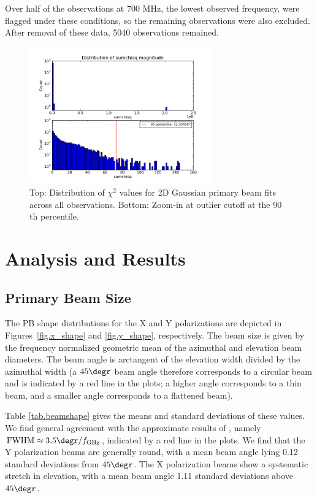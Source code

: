 \documentclass[preprint]{aastex}
\begin{document}
Over half of the observations at 700 MHz, the lowest observed frequency,
were flagged under these conditions, so the remaining observations
were also excluded.  After removal of
these data, 5040 observations remained.

\begin{figure}[htb]
\begin{center}
\includegraphics[width=0.7\textwidth]{images/dist_sumchisq}
\caption{Top: Distribution of $\chi^2$ values for 2D Gaussian primary
  beam fits across all observations.  Bottom: Zoom-in at outlier
  cutoff at the 90$\textrm{th}$ percentile. \label{fig.dist_sumchisq}}
\end{center}
\end{figure}


\section{Analysis and Results}\label{s.results}

\subsection{Primary Beam Size}\label{ss.beamsize}
The PB shape distributions for the X and Y polarizations are depicted in 
Figures~\ref{fig.x_shape} and \ref{fig.y_shape}, respectively.  The beam size 
is given by the frequency normalized geometric mean of the azimuthal and 
elevation beam diameters.  The beam angle is arctangent of the elevation 
width divided by the azimuthal width (a $45\degr$ beam angle therefore 
corresponds to a circular beam and is indicated by a red line in the plots; a 
higher angle corresponds to a thin beam, and a smaller angle corresponds 
to a flattened beam).

Table \ref{tab.beamshape} gives the means and standard
deviations of these values.  We find general agreement with the
approximate results of \citet{Harp2011}, namely $\textrm{FWHM} \approx
3.5\degr / f_\textrm{GHz}$, indicated by a red line in the plots.  We find 
that the Y polarization beams are generally round, with a mean beam angle 
lying 0.12 standard deviations from $45\degr$.  The X polarization beams 
show a systematic stretch in elevation, with a mean beam angle 1.11 
standard deviations above $45\degr$.
\end{document}
